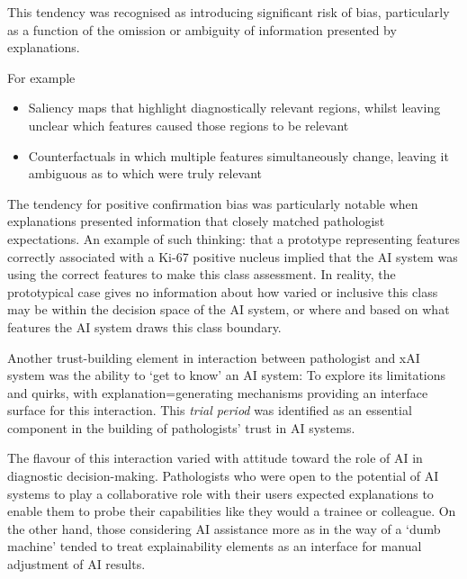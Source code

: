 This tendency was recognised as introducing significant risk of bias, particularly as a function of the omission or ambiguity of information presented by explanations. %

For example

\begin{itemize}
    \item Saliency maps that highlight diagnostically relevant regions, whilst leaving unclear which features caused those regions to be relevant
    \item Counterfactuals in which multiple features simultaneously change, leaving it ambiguous as to which were truly relevant
\end{itemize}

The tendency for positive confirmation bias was particularly notable when explanations presented information that closely matched pathologist expectations. An example of such thinking: that a prototype representing features correctly associated with a Ki-67 positive nucleus implied that the AI system was using the correct features to make this class assessment. In reality, the prototypical case gives no information about how varied or inclusive this class may be within the decision space of the AI system, or where and based on what features the AI system draws this class boundary.


Another trust-building element in interaction between pathologist and xAI system was the ability to `get to know' an AI system: To explore its limitations and quirks, with explanation=generating mechanisms providing an interface surface for this interaction. This \textit{trial period} was identified as an essential component in the building of pathologists' trust in AI systems. 

The flavour of this interaction varied with attitude toward the role of AI in diagnostic decision-making. Pathologists who were open to the potential of AI systems to play a collaborative role with their users expected explanations to enable them to probe their capabilities like they would a trainee or colleague. On the other hand, those considering AI assistance more as in the way of a `dumb machine' tended to treat explainability elements as an interface for manual adjustment of AI results.

